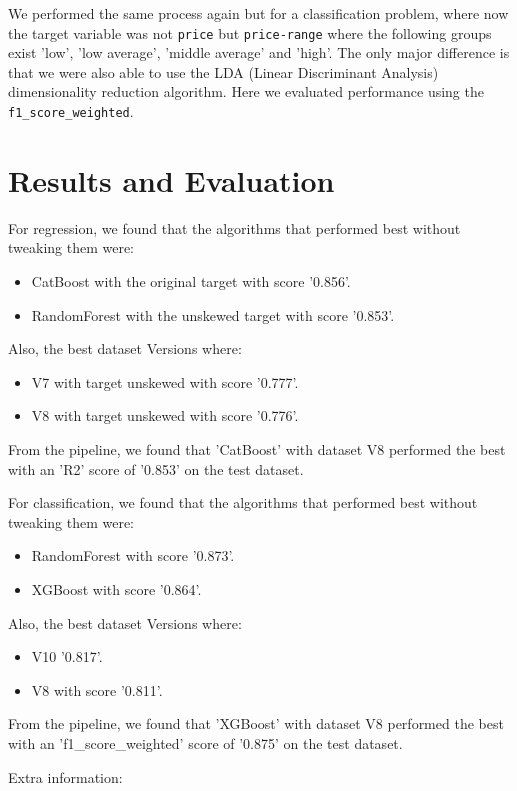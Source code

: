 \documentclass[conference]{IEEEtran}
\begin{document}
We performed the same process again but for a classification problem, where now
the target variable was not \texttt{price} but \texttt{price-range} where the
following groups exist 'low', 'low average', 'middle average' and 'high'. The
only major difference is that we were also able to use the LDA (Linear
Discriminant Analysis) dimensionality reduction algorithm. Here we evaluated
performance using the \texttt{f1\_score\_weighted}.

\section{Results and Evaluation}
For regression, we found that the algorithms that performed best without
tweaking them were:
\begin{itemize}
    \item CatBoost with the original target with score '0.856'.
    \item RandomForest with the unskewed target with score '0.853'.
\end{itemize}
Also, the best dataset Versions where:
\begin{itemize}
    \item V7 with target unskewed with score '0.777'.
    \item V8 with target unskewed with score '0.776'.
\end{itemize}
From the pipeline, we found that 'CatBoost' with dataset V8 performed the best
with an 'R2' score of '0.853' on the test dataset.

For classification, we found that the algorithms that performed best without
tweaking them were:
\begin{itemize}
    \item RandomForest with score '0.873'.
    \item XGBoost with score '0.864'.
\end{itemize}
Also, the best dataset Versions where:
\begin{itemize}
    \item V10 '0.817'.
    \item V8 with score '0.811'.
\end{itemize}
From the pipeline, we found that 'XGBoost' with dataset V8 performed the best
with an 'f1\_score\_weighted' score of '0.875' on the test dataset.

\vspace{1em}
Extra information:
\end{document}
